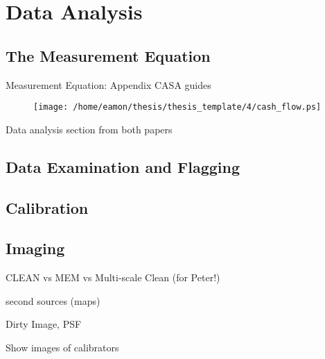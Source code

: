 
\chapter{Data Analysis} \label{chap:4}

\section{The Measurement Equation}\label{sec:4.1}

Measurement Equation: Appendix CASA guides

\begin{figure}[hbt!]
\centering 
          \texttt{[image: /home/eamon/thesis/thesis\_template/4/cash\_flow.ps]}
\caption[]{}
\label{fig:4.1}
\end{figure}

Data analysis section from both papers

\section{Data Examination and Flagging}\label{sec:4.2}

\section{Calibration}\label{sec:4.3}

\section{Imaging}\label{sec:4.4}

CLEAN vs MEM vs Multi-scale Clean (for Peter!)

second sources (maps)

Dirty Image, PSF

Show images of calibrators